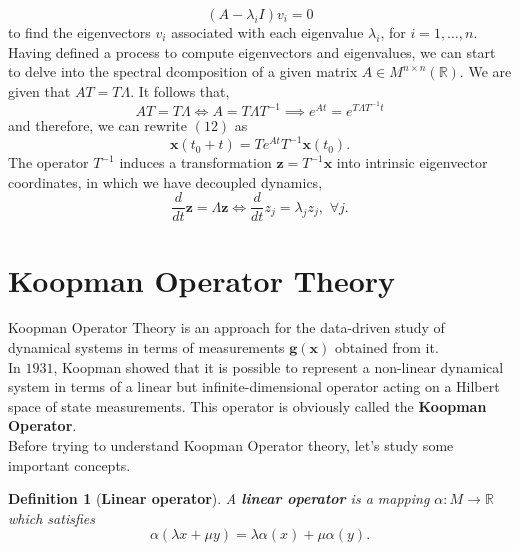 \documentclass[]{article}
\newtheorem{definition}{Definition}
\begin{document}
\begin{equation}
	(A-\lambda_i I)v_i=0
\end{equation}
to find the eigenvectors $v_i$ associated with each eigenvalue $\lambda_i$, for $i=1,\dots,n$.
Having defined a process to compute eigenvectors and eigenvalues, we can start to delve into the spectral dcomposition of a given matrix $A \in M^{n \times n}(\mathbb{R})$. We are given that $AT=T\Lambda$. It follows that,
\begin{equation}
	AT=T\Lambda \iff A = T\Lambda T^{-1} \implies e^{At} = e^{T\Lambda T^{-1} t} 
\end{equation}
and therefore, we can rewrite $(12)$ as
\begin{equation}
	\textbf{x}(t_0+t) = Te^{At}T^{-1}\textbf{x}(t_0).
\end{equation}
The operator $T^{-1}$ induces a transformation $\textbf{z}=T^{-1}\textbf{x}$ into intrinsic eigenvector coordinates, in which we have decoupled dynamics, 
\begin{equation}
	\frac{d}{dt} \textbf{z} = \Lambda \textbf{z} \iff \frac{d}{dt} z_j=\lambda_j z_j, \,\, \forall j.
\end{equation}

\section{Koopman Operator Theory}
Koopman Operator Theory is an approach for the data-driven study of dynamical systems in terms of measurements $\textbf{g}(\textbf{x})$ obtained from it. \\
In $1931$, Koopman showed that it is possible to represent a non-linear dynamical system in terms of a linear but infinite-dimensional operator acting on a Hilbert space of state measurements. This operator is obviously called the \textbf{Koopman Operator}. \\
Before trying to understand Koopman Operator theory, let's study some important concepts.
\begin{definition}[\textbf{Linear operator}]
A \textbf{linear operator} is a mapping $\alpha:M \to \mathbb{R}$ which satisfies
\begin{equation}
	\alpha(\lambda x + \mu y) = \lambda \alpha(x) + \mu \alpha(y).
\end{equation}
\end{definition}
\end{document}
